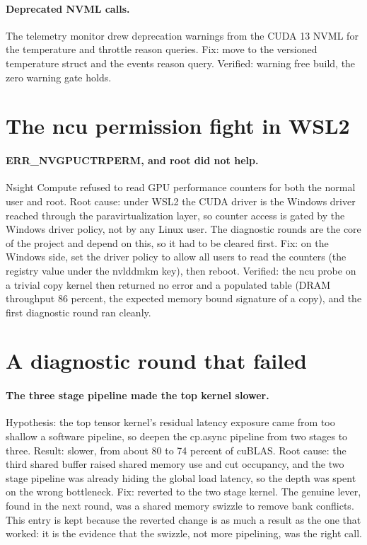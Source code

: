 \documentclass[11pt]{article}
\begin{document}
\paragraph{Deprecated NVML calls.} The telemetry monitor drew deprecation warnings
from the CUDA 13 NVML for the temperature and throttle reason queries. Fix: move to
the versioned temperature struct and the events reason query. Verified: warning
free build, the zero warning gate holds.

\section{The ncu permission fight in WSL2}

\paragraph{ERR\_NVGPUCTRPERM, and root did not help.} Nsight Compute refused to
read GPU performance counters for both the normal user and root. Root cause: under
WSL2 the CUDA driver is the Windows driver reached through the paravirtualization
layer, so counter access is gated by the Windows driver policy, not by any Linux
user. The diagnostic rounds are the core of the project and depend on this, so it
had to be cleared first. Fix: on the Windows side, set the driver policy to allow
all users to read the counters (the registry value under the nvlddmkm key), then
reboot. Verified: the ncu probe on a trivial copy kernel then returned no error and
a populated table (DRAM throughput 86 percent, the expected memory bound signature
of a copy), and the first diagnostic round ran cleanly.

\section{A diagnostic round that failed}

\paragraph{The three stage pipeline made the top kernel slower.} Hypothesis: the
top tensor kernel's residual latency exposure came from too shallow a software
pipeline, so deepen the cp.async pipeline from two stages to three. Result: slower,
from about 80 to 74 percent of cuBLAS. Root cause: the third shared buffer raised
shared memory use and cut occupancy, and the two stage pipeline was already hiding
the global load latency, so the depth was spent on the wrong bottleneck. Fix:
reverted to the two stage kernel. The genuine lever, found in the next round, was a
shared memory swizzle to remove bank conflicts. This entry is kept because the
reverted change is as much a result as the one that worked: it is the evidence that
the swizzle, not more pipelining, was the right call.
\end{document}
